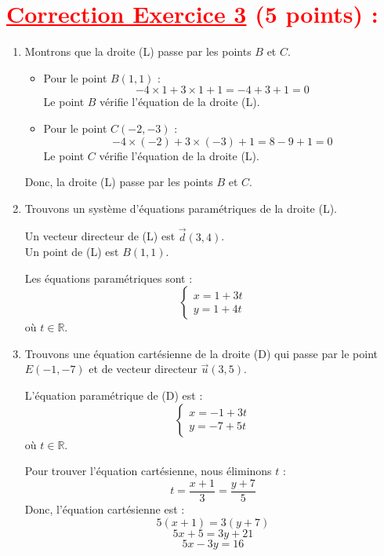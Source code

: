 \documentclass[12pt]{article}
\begin{document}
\section*{\textcolor{red}{\underline{Correction Exercice 3} (5 points) :}}
\begin{enumerate}
    \item Montrons que la droite (L) passe par les points \(B\) et \(C\).
    
    \begin{itemize}
        \item Pour le point \(B(1, 1)\) :
        \[
        -4 \times 1 + 3 \times 1 + 1 = -4 + 3 + 1 = 0
        \]
        Le point \(B\) vérifie l'équation de la droite (L).

        \item Pour le point \(C(-2, -3)\) :
        \[
        -4 \times (-2) + 3 \times (-3) + 1 = 8 - 9 + 1 = 0
        \]
        Le point \(C\) vérifie l'équation de la droite (L).
    \end{itemize}
    Donc, la droite (L) passe par les points \(B\) et \(C\).

    \item Trouvons un système d’équations paramétriques de la droite (L).

    Un vecteur directeur de (L) est \(\vec{d}(3, 4)\).\\
    Un point de (L) est \(B(1, 1)\).

    Les équations paramétriques sont :
    \[
    \begin{cases}
    x = 1 + 3t \\
    y = 1 + 4t
    \end{cases}
    \]
    où \(t \in \mathbb{R}\).

    \item Trouvons une équation cartésienne de la droite (D) qui passe par le point \(E(-1, -7)\) et de vecteur directeur \(\vec{u}(3, 5)\).

    L'équation paramétrique de (D) est :
    \[
    \begin{cases}
    x = -1 + 3t \\
    y = -7 + 5t
    \end{cases}
    \]
    où \(t \in \mathbb{R}\).

    Pour trouver l'équation cartésienne, nous éliminons \(t\) :
    \[
    t = \frac{x + 1}{3} = \frac{y + 7}{5}
    \]
    Donc, l'équation cartésienne est :
    \[
    5(x + 1) = 3(y + 7)
    \]
    \[
    5x + 5 = 3y + 21
    \]
    \[
    5x - 3y = 16
    \]


\end{enumerate}
\end{document}

